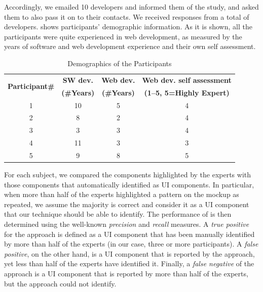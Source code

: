 Accordingly, we emailed 10 developers and informed them of the study, and asked them to also pass it on to their contacts. We received responses from a total of \numberOfParticipants developers.
 shows participants'  demographic information.
As it is shown, all the participants were quite experienced in web development,
as measured by the years of software and web development experience
and their own self assessment.

\begin{table}[b]
	\caption{Demographics of the Participants}
	\centering
	\begin{threeparttable}
		\bgroup
		\begin{tabular}{c c c c}
			\toprule
			\multirow{2}{*}{\textbf{Participant\#}} & \textbf{SW dev.}   & \textbf{Web dev.}  & \textbf{Web dev. self assessment} \\
			                                        & \textbf{(\#Years)} & \textbf{(\#Years)} & \textbf{(1--5, 5=Highly Expert)}  \\ \toprule
			                   1                    & 10                 & 5                  & 4                                 \\
			                   2                    & 8                  & 2                  & 4                                 \\
			                   3                    & 3                  & 3                  & 4                                 \\
			                   4                    & 11                 & 3                  & 3                                 \\
			                   5                    & 9                  & 8                  & 5                                 \\ \bottomrule
		\end{tabular}
		\egroup
	\end{threeparttable}
	\label{table:participants-demographics}
\end{table}

For each subject, we compared the components highlighted by the experts 
with those components that \toolname automatically identified as UI components.
In particular, when more than half of the experts
highlighted a pattern on the mockup as repeated, 
we assume the majority is correct and consider it as a UI component  
that our technique should be able to identify.
The performance of \toolname is then determined using the well-known \textit{precision} and \textit{recall} measures.
A \textit{true positive} for the approach is defined as a UI component that has been manually identified
by more than half of the experts (in our case, three or more participants).
A \textit{false positive}, on the other hand, is a UI component that is reported 
by the approach, yet less than half of the experts have identified it.
Finally, a \textit{false negative} of the approach
is a UI component that is reported by more than half of the experts, 
but the approach could not identify.

